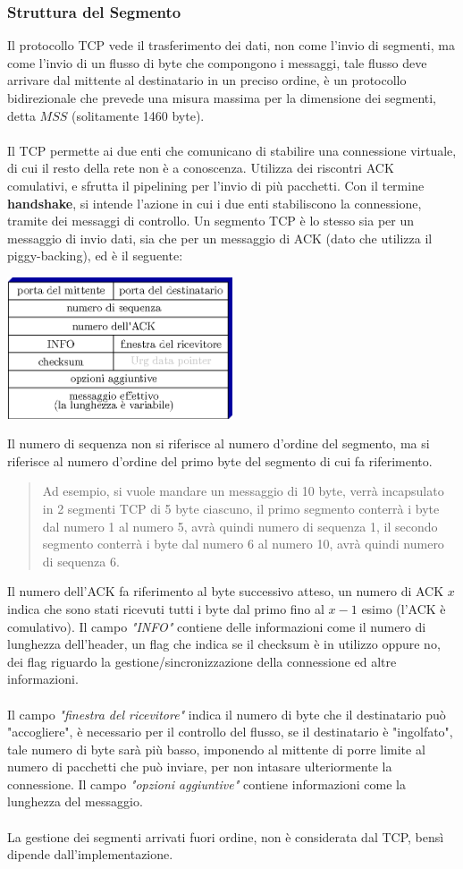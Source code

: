 \documentclass[12pt, letterpaper]{article}
\newcommand{\acc}{\\\hphantom{}\\}
\begin{document}
\subsubsection{Struttura del Segmento}
Il protocollo TCP vede il trasferimento dei dati, non come l'invio di segmenti, ma come l'invio di un
flusso di byte che compongono i messaggi, tale flusso deve arrivare dal mittente al destinatario in un
preciso ordine, è un protocollo bidirezionale che prevede una misura massima per la dimensione dei segmenti,
detta $MSS$ (solitamente 1460 byte).\acc
Il TCP permette ai due enti che comunicano di stabilire una connessione virtuale, di cui il resto della rete
non è a conoscenza. Utilizza dei riscontri ACK comulativi, e sfrutta il pipelining per l'invio di più
pacchetti. Con il termine \textbf{handshake}, si intende l'azione in cui i due enti stabiliscono la
connessione, tramite dei messaggi di controllo. Un segmento TCP è lo stesso sia per un messaggio di invio dati, sia
che per un messaggio di ACK (dato che utilizza il piggy-backing), ed è il seguente:\begin{center}
    \includegraphics[width=0.5\textwidth ]{images/TCPsegment.eps}
\end{center}
Il numero di sequenza non si riferisce al numero d'ordine del segmento, ma si riferisce al numero d'ordine
del primo byte del segmento di cui fa riferimento.\begin{quote}\color{gray}
    Ad esempio, si vuole mandare un messaggio di 10 byte, verrà incapsulato in 2 segmenti TCP di
    5 byte ciascuno, il primo segmento conterrà i byte dal numero 1 al numero 5, avrà quindi numero di
    sequenza 1, il secondo segmento conterrà i byte dal numero 6 al numero 10, avrà quindi numero di
    sequenza 6.\color{black}
\end{quote}
Il numero dell'ACK fa riferimento al byte successivo atteso, un numero di ACK $x$ indica che sono stati ricevuti tutti
i byte dal primo fino al $x-1$ esimo (l'ACK è comulativo). Il campo \textit{"INFO"} contiene delle informazioni come il numero di lunghezza
dell'header, un flag che indica se il checksum è in utilizzo oppure no, dei flag riguardo la gestione/sincronizzazione
della connessione ed altre informazioni.\acc
Il campo \textit{"finestra del ricevitore"} indica il numero di byte che il destinatario può "accogliere",
è necessario per il controllo del flusso, se il destinatario è "ingolfato", tale numero
di byte sarà più basso, imponendo al mittente di porre limite al numero di pacchetti che può inviare, per non intasare
ulteriormente la connessione. Il campo \textit{"opzioni aggiuntive"} contiene informazioni come la lunghezza
del messaggio.\acc
La gestione dei segmenti arrivati fuori ordine, non è considerata dal TCP, bensì dipende dall'implementazione.
\end{document}
